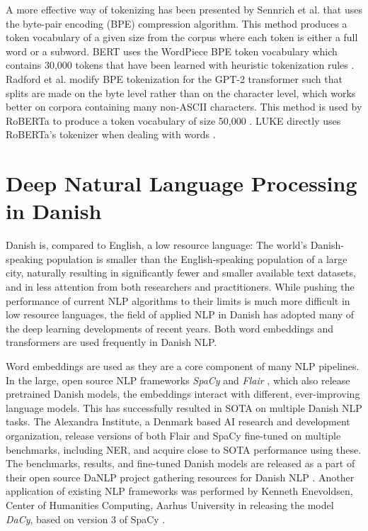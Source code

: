 \documentclass[main.tex]{subfiles}
\begin{document}
A more effective way of tokenizing has been presented by Sennrich et al. \cite{sennrich-etal-2016-neural} that uses the byte-pair encoding (BPE) compression algorithm.
This method produces a token vocabulary of a given size from the corpus where each token is either a full word or a subword.
BERT uses the WordPiece BPE token vocabulary which contains 30,000 tokens that have been learned with heuristic tokenization rules \cite{wu2016tokenize, devlin2019bert}.
Radford et al. \cite{Radford2019gpt2} modify BPE tokenization for the GPT-2 transformer such that splits are made on the byte level rather than on the character level, which works better on corpora containing many non-ASCII characters.
This method is used by RoBERTa to produce a token vocabulary of size 50,000 \cite{liu2019roberta}.
LUKE directly uses RoBERTa's tokenizer when dealing with words \cite{yamada2020luke}.

\section{Deep Natural Language Processing in Danish}
\label{sec:nlpda}
Danish is, compared to English, a low resource language:
The world's Danish-speaking population is smaller than the English-speaking population of a large city, naturally resulting in significantly fewer and smaller available text datasets, and in less attention from both researchers and practitioners.
While pushing the performance of current NLP algorithms to their limits is much more difficult in low resource languages, the field of applied NLP in Danish has adopted many of the deep learning developments of recent years.
Both word embeddings and transformers are used frequently in Danish NLP.

Word embeddings are used as they are a core component of many NLP pipelines.
In the large, open source NLP frameworks \emph{SpaCy} \cite{honnibal2020spacy} and \emph{Flair} \cite{akbik2019flair}, which also release pretrained Danish models, the embeddings interact with different, ever-improving language models.
This has successfully resulted in SOTA on multiple Danish NLP tasks.
The Alexandra Institute, a Denmark based AI research and development organization, release versions of both Flair and SpaCy fine-tuned on multiple benchmarks, including NER, and acquire close to SOTA performance using these.
The benchmarks, results, and fine-tuned Danish models are released as a part of their open source DaNLP project gathering resources for Danish NLP \cite{danlp2021}.
Another application of existing NLP frameworks was performed by Kenneth Enevoldsen, Center of Humanities Computing, Aarhus University in releasing the model \emph{DaCy}, based on version 3 of SpaCy \cite{enevoldsen2020dacy}.
\end{document}
